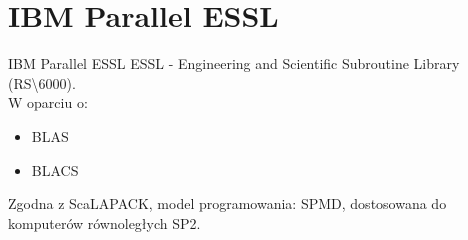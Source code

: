 \section{IBM Parallel ESSL}
	\begin{frame}{IBM Parallel ESSL}
		ESSL - Engineering and Scientific Subroutine Library (RS\textbackslash6000). \\
		W oparciu o:
		\begin{itemize}
			\item BLAS
			\item BLACS
		\end{itemize}
		Zgodna z ScaLAPACK, model programowania: SPMD, dostosowana do komputerów równoległych SP2. \\
	\end{frame}